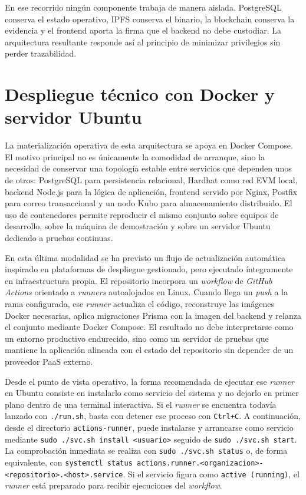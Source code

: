 \documentclass[11pt, a4paper]{article}
\begin{document}
En ese recorrido ningún componente trabaja de manera aislada. PostgreSQL conserva el estado operativo, IPFS conserva el binario, la blockchain conserva la evidencia y el frontend aporta la firma que el backend no debe custodiar. La arquitectura resultante responde así al principio de minimizar privilegios sin perder trazabilidad.

\section{Despliegue técnico con Docker y servidor Ubuntu}

La materialización operativa de esta arquitectura se apoya en Docker Compose. El motivo principal no es únicamente la comodidad de arranque, sino la necesidad de conservar una topología estable entre servicios que dependen unos de otros: PostgreSQL para persistencia relacional, Hardhat como red EVM local, backend Node.js para la lógica de aplicación, frontend servido por Nginx, Postfix para correo transaccional y un nodo Kubo para almacenamiento distribuido. El uso de contenedores permite reproducir el mismo conjunto sobre equipos de desarrollo, sobre la máquina de demostración y sobre un servidor Ubuntu dedicado a pruebas continuas.

En esta última modalidad se ha previsto un flujo de actualización automática inspirado en plataformas de despliegue gestionado, pero ejecutado íntegramente en infraestructura propia. El repositorio incorpora un \textit{workflow} de \textit{GitHub Actions} orientado a \textit{runners} autoalojados en Linux. Cuando llega un \textit{push} a la rama configurada, ese \textit{runner} actualiza el código, reconstruye las imágenes Docker necesarias, aplica migraciones Prisma con la imagen del backend y relanza el conjunto mediante Docker Compose. El resultado no debe interpretarse como un entorno productivo endurecido, sino como un servidor de pruebas que mantiene la aplicación alineada con el estado del repositorio sin depender de un proveedor PaaS externo.

Desde el punto de vista operativo, la forma recomendada de ejecutar ese \textit{runner} en Ubuntu consiste en instalarlo como servicio del sistema y no dejarlo en primer plano dentro de una terminal interactiva. Si el \textit{runner} se encuentra todavía lanzado con \texttt{./run.sh}, basta con detener ese proceso con \texttt{Ctrl+C}. A continuación, desde el directorio \texttt{actions-runner}, puede instalarse y arrancarse como servicio mediante \texttt{sudo ./svc.sh install <usuario>} seguido de \texttt{sudo ./svc.sh start}. La comprobación inmediata se realiza con \texttt{sudo ./svc.sh status} o, de forma equivalente, con \texttt{systemctl status actions.runner.<organizacion>-<repositorio>.<host>.service}. Si el servicio figura como \texttt{active (running)}, el \textit{runner} está preparado para recibir ejecuciones del \textit{workflow}.
\end{document}
